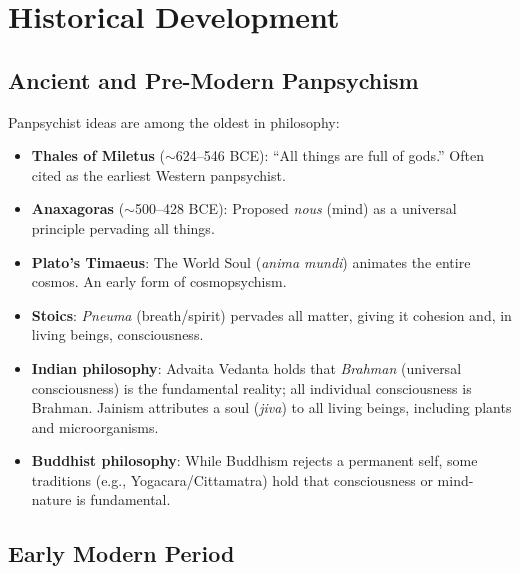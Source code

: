 \documentclass[11pt,a4paper]{report}
\begin{document}
\chapter{Historical Development}

\section{Ancient and Pre-Modern Panpsychism}

Panpsychist ideas are among the oldest in philosophy:

\begin{histbox}
\begin{itemize}[leftmargin=1.5em]
  \item \textbf{Thales of Miletus} ($\sim$624--546 BCE): ``All things are full of gods.'' Often cited as the earliest Western panpsychist.
  \item \textbf{Anaxagoras} ($\sim$500--428 BCE): Proposed \emph{nous} (mind) as a universal principle pervading all things.
  \item \textbf{Plato's Timaeus}: The World Soul (\emph{anima mundi}) animates the entire cosmos. An early form of cosmopsychism.
  \item \textbf{Stoics}: \emph{Pneuma} (breath/spirit) pervades all matter, giving it cohesion and, in living beings, consciousness.
  \item \textbf{Indian philosophy}: Advaita Vedanta holds that \emph{Brahman} (universal consciousness) is the fundamental reality; all individual consciousness is Brahman. Jainism attributes a soul (\emph{jiva}) to all living beings, including plants and microorganisms.
  \item \textbf{Buddhist philosophy}: While Buddhism rejects a permanent self, some traditions (e.g., Yogacara/Cittamatra) hold that consciousness or mind-nature is fundamental.
\end{itemize}
\end{histbox}

\section{Early Modern Period}
\end{document}
